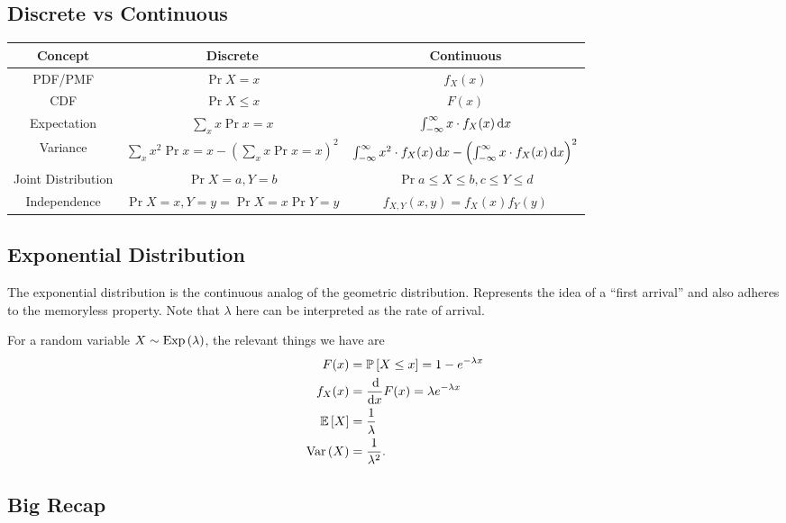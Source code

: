 \subsection{Discrete vs Continuous}
\begin{tabular}{|c|c|c|}
    \hline
    Concept & Discrete & Continuous \\
    \hline 
    PDF/PMF & $\Pr{X = x}$ & $f_X(x)$ \\
    \hline 
    CDF & $\Pr{X \le x}$ & $F(x)$ \\ 
    \hline 
    Expectation & $\sum_{x} x \Pr{x=x}$ & $\int_{-\infty}^{\infty} x \cdot f_{X}(x) \operatorname{d\!} x$ \\
    \hline 
    Variance & $\sum_{x} x^2 \Pr{x=x} - \left(\sum_{x} x \Pr{x=x}\right)^2$ & $\int_{-\infty}^{\infty} x^2 \cdot f_{X}(x) \operatorname{d\!} x - \left(\int_{-\infty}^{\infty} x \cdot f_{X}(x) \operatorname{d\!} x\right)^2$\\
    \hline 
    Joint Distribution & $\Pr{X=a, Y=b}$ & $\Pr{a \le X \le b, c \le Y \le d}$ \\
    \hline 
    Independence & $\Pr{X=x, Y=y} = \Pr{X=x}\Pr{Y=y}$ & $f_{X,Y}(x,y) = f_X(x) f_Y(y)$ \\ 
    \hline
\end{tabular}

\subsection{Exponential Distribution}

The exponential distribution is the continuous analog of the geometric distribution. Represents the idea of a ``first arrival'' and also adheres to the memoryless property. Note that $\lambda$ here can be interpreted as the rate of arrival. 

For a random variable $X \sim \text{Exp}\left( \lambda \right)$, the relevant things we have are \begin{align*} F(x) &= \mathbb{P}\left[ X \le x \right] = 1 - e^{-\lambda x} \\ f_X(x) &= \frac{\operatorname{d\!}}{\operatorname{d\!} x} F(x) = \lambda e^{-\lambda x} \\ \mathbb{E}\left[ X \right] &= \frac{1}{\lambda} \\ \text{Var}\left( X \right) &= \frac{1}{\lambda^2}. \end{align*}

\subsection{Big Recap}
